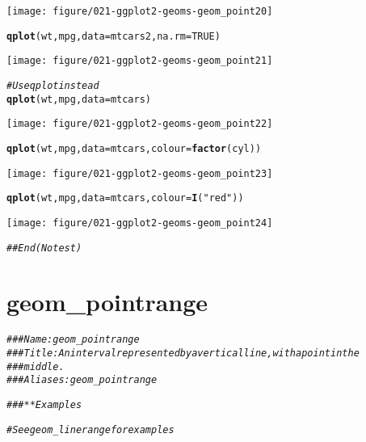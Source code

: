 \documentclass[a4paper,titlepage]{tufte-handout}\usepackage[]{graphicx}\usepackage[]{color}
\makeatletter
\def\maxwidth{ %
  \ifdim\Gin@nat@width>\linewidth
    \linewidth
  \else
    \Gin@nat@width
  \fi
}
\newcommand{\hlnum}[1]{\textcolor[rgb]{0.686,0.059,0.569}{#1}}%
\newcommand{\hlstr}[1]{\textcolor[rgb]{0.192,0.494,0.8}{#1}}%
\newcommand{\hlcom}[1]{\textcolor[rgb]{0.678,0.584,0.686}{\textit{#1}}}%
\newcommand{\hlstd}[1]{\textcolor[rgb]{0.345,0.345,0.345}{#1}}%
\newcommand{\hlkwc}[1]{\textcolor[rgb]{0.333,0.667,0.333}{#1}}%
\newcommand{\hlkwd}[1]{\textcolor[rgb]{0.737,0.353,0.396}{\textbf{#1}}}%
\newenvironment{kframe}{%
 \def\at@end@of@kframe{}%
 \ifinner\ifhmode%
  \def\at@end@of@kframe{\end{minipage}}%
  \begin{minipage}{\columnwidth}%
 \fi\fi%
 \def\FrameCommand##1{\hskip\@totalleftmargin \hskip-\fboxsep
 \colorbox{shadecolor}{##1}\hskip-\fboxsep
     \hskip-\linewidth \hskip-\@totalleftmargin \hskip\columnwidth}%
 \MakeFramed {\advance\hsize-\width
   \@totalleftmargin\z@ \linewidth\hsize
   \@setminipage}}%
 {\par\unskip\endMakeFramed%
 \at@end@of@kframe}
\newenvironment{knitrout}{}{} %
\makeatother
\begin{document}
\begin{knitrout}
\begin{kframe}
{\ttfamily\noindent\color{warningcolor}{\#\# Warning: Removed 11 rows containing missing values (geom\_point).}}\end{kframe}
\texttt{[image: figure/021-ggplot2-geoms-geom\_point20]} 
\begin{kframe}\begin{alltt}
\hlkwd{qplot}\hlstd{(wt, mpg,} \hlkwc{data} \hlstd{= mtcars2,} \hlkwc{na.rm} \hlstd{=} \hlnum{TRUE}\hlstd{)}
\end{alltt}
\end{kframe}
\texttt{[image: figure/021-ggplot2-geoms-geom\_point21]} 
\begin{kframe}\begin{alltt}
\hlcom{# Use qplot instead}
\hlkwd{qplot}\hlstd{(wt, mpg,} \hlkwc{data} \hlstd{= mtcars)}
\end{alltt}
\end{kframe}
\texttt{[image: figure/021-ggplot2-geoms-geom\_point22]} 
\begin{kframe}\begin{alltt}
\hlkwd{qplot}\hlstd{(wt, mpg,} \hlkwc{data} \hlstd{= mtcars,} \hlkwc{colour} \hlstd{=} \hlkwd{factor}\hlstd{(cyl))}
\end{alltt}
\end{kframe}
\texttt{[image: figure/021-ggplot2-geoms-geom\_point23]} 
\begin{kframe}\begin{alltt}
\hlkwd{qplot}\hlstd{(wt, mpg,} \hlkwc{data} \hlstd{= mtcars,} \hlkwc{colour} \hlstd{=} \hlkwd{I}\hlstd{(}\hlstr{"red"}\hlstd{))}
\end{alltt}
\end{kframe}
\texttt{[image: figure/021-ggplot2-geoms-geom\_point24]} 
\begin{kframe}\begin{alltt}
\hlcom{## End(No test)}
\end{alltt}
\end{kframe}
\end{knitrout}



\section{geom\_pointrange}

\begin{knitrout}
\color{fgcolor}\begin{kframe}
\begin{alltt}
\hlcom{### Name: geom_pointrange}
\hlcom{### Title: An interval represented by a vertical line, with a point in the}
\hlcom{###   middle.}
\hlcom{### Aliases: geom_pointrange}

\hlcom{### ** Examples}

\hlcom{# See geom_linerange for examples}
\end{alltt}
\end{kframe}
\end{knitrout}
\end{document}
